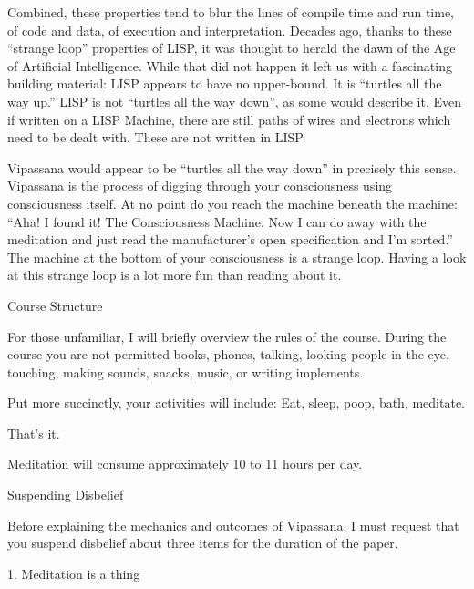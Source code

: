 \documentclass{article}
\begin{document}
Combined, these properties tend to blur the lines of compile time and run time, of code and data, of execution and interpretation. Decades ago, thanks to these ``strange loop'' properties of LISP, it was thought to herald the dawn of the Age of Artificial Intelligence. While that did not happen it left us with a fascinating building material: LISP appears to have no upper-bound. It is ``turtles all the way up.'' LISP is not ``turtles all the way down'', as some would describe it. Even if written on a LISP Machine, there are still paths of wires and electrons which need to be dealt with. These are not written in LISP.

Vipassana would appear to be ``turtles all the way down'' in precisely this sense. Vipassana is the process of digging through your consciousness using consciousness itself. At no point do you reach the machine beneath the machine: ``Aha! I found it! The Consciousness Machine. Now I can do away with the meditation and just read the manufacturer's open specification and I'm sorted.'' The machine at the bottom of your consciousness is a strange loop. Having a look at this strange loop is a lot more fun than reading about it.

\pagebreak

\begin{center}
  \Huge{Course Structure}
\end{center}

For those unfamiliar, I will briefly overview the rules of the course. During the course you are not permitted books, phones, talking, looking people in the eye, touching, making sounds, snacks, music, or writing implements.

Put more succinctly, your activities will include: Eat, sleep, poop, bath, meditate.

That's it.

Meditation will consume approximately 10 to 11 hours per day.

\pagebreak

\begin{center}
  \Huge{Suspending Disbelief}
\end{center}

Before explaining the mechanics and outcomes of Vipassana, I must request that you suspend disbelief about three items for the duration of the paper.

\begin{center}
  \LARGE{1. Meditation is a thing}
\end{center}
\end{document}
